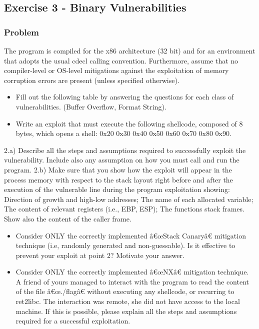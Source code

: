\documentclass{article}
\begin{document}
\subsection{Exercise 3 - Binary Vulnerabilities}
\subsubsection*{Problem}
The program is compiled for the x86 architecture (32 bit) and for an environment that adopts the usual cdecl calling convention. Furthermore, assume that no compiler-level or OS-level mitigations against the exploitation of memory corruption errors are present (unless specified otherwise).

\begin{itemize}
    \item[\textbf{1.}] [1 point] Fill out the following table by answering the questions for each class of vulnerabilities. (Buffer Overflow, Format String).
    \item[\textbf{2.}] [2 points] Write an exploit that must execute the following shellcode, composed of 8 bytes, which opens a shell: 0x20 0x30 0x40 0x50 0x60 0x70 0x80 0x90.
\end{itemize}
2.a) Describe all the steps and assumptions required to successfully exploit the vulnerability. Include also any assumption on how you must call and run the program.
2.b) Make sure that you show how the exploit will appear in the process memory with respect to the stack layout right before and after the execution of the vulnerable line during the program exploitation showing: Direction of growth and high-low addresses; The name of each allocated variable; The content of relevant registers (i.e., EBP, ESP); The functions stack frames. Show also the content of the caller frame.
\begin{itemize}
    \item[\textbf{3.}] [1 points] Consider ONLY the correctly implemented â€œStack Canaryâ€ mitigation technique (i.e, randomly generated and non-guessable). Is it effective to prevent your exploit at point 2? Motivate your answer.
    \item[\textbf{4.}] [2 points] Consider ONLY the correctly implemented â€œNXâ€ mitigation technique. A friend of yours managed to interact with the program to read the content of the file â€œ./flagâ€ without executing any shellcode, or recurring to ret2libc. The interaction was remote, she did not have access to the local machine. If this is possible, please explain all the steps and assumptions required for a successful exploitation.
\end{itemize}
\end{document}
